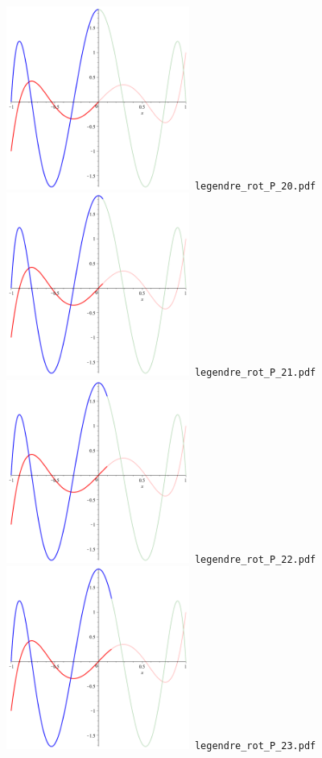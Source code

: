 \documentclass[a4paper]{amsart}
\begin{document}
\includegraphics[width=6cm]{legendre_rot_P_20.pdf}\verb+ legendre_rot_P_20.pdf+\\
\includegraphics[width=6cm]{legendre_rot_P_21.pdf}\verb+ legendre_rot_P_21.pdf+\\
\includegraphics[width=6cm]{legendre_rot_P_22.pdf}\verb+ legendre_rot_P_22.pdf+\\
\includegraphics[width=6cm]{legendre_rot_P_23.pdf}\verb+ legendre_rot_P_23.pdf+\\
\end{document}
